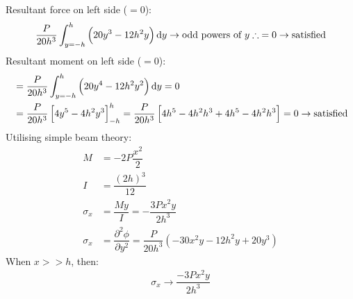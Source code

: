 \documentclass[11pt]{article}
\numberwithin{equation}{section}
\begin{document}
Resultant force on left side ($= 0$):
\begin{align}
    \dfrac{P}{20h^3}\int_{y=-h}^h \left(20y^3 - 12h^2 y\right)\dif y \rightarrow \textrm{odd powers of } y \therefore\; = 0 \rightarrow \textrm{satisfied}
\end{align}
Resultant moment on left side ($= 0$):
\begin{align}
     & = \dfrac{P}{20h^3}\int_{y=-h}^h \left(20y^4 - 12h^2 y^2\right)\dif y = 0                                                                             \\
     & = \dfrac{P}{20h^3}\left[4y^5-4h^2y^3\right]_{-h}^h = \dfrac{P}{20h^3}\left[4h^5 - 4h^2h^3 + 4h^5 - 4h^2h^3\right] = 0 \rightarrow \textrm{satisfied}
\end{align}
Utilising simple beam theory:
\begin{align}
    M        & = - 2P\dfrac{x^2}{2}                                                                          \\
    I        & = \dfrac{\left(2h\right)^3}{12}                                                               \\
    \sigma_x & = \dfrac{My}{I} = -\dfrac{3Px^2y}{2h^3}                                                       \\
    \sigma_x & = \dfrac{\partial^2 \phi}{\partial y^2} = \dfrac{P}{20h^3}\left(-30x^2 y -12h^2y+20y^3\right)
\end{align}
When $x>>h$, then:
\begin{gather}
    \sigma_x \rightarrow \dfrac{-3Px^2y}{2h^3}
\end{gather}
\end{document}
